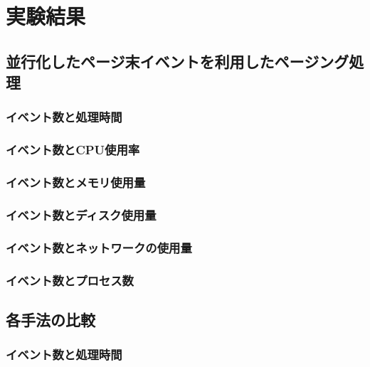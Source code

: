 \documentclass[../../main]{subfiles}
\begin{document}
    \section{実験結果}\label{sec:result}
    
    

    

    

    \subsection{並行化したページ末イベントを利用したページング処理}\label{subsec:result-paging-last-async}
    \subsubsection{イベント数と処理時間}\label{subsubsec:result-paging-last-async-time}
    \subsubsection{イベント数とCPU使用率}\label{subsubsec:result-paging-last-async-cpu}
    \subsubsection{イベント数とメモリ使用量}\label{subsubsec:result-paging-last-async-memory}
    \subsubsection{イベント数とディスク使用量}\label{subsubsec:result-paging-last-async-disk}
    \subsubsection{イベント数とネットワークの使用量}\label{subsubsec:result-paging-last-async-network}
    \subsubsection{イベント数とプロセス数}\label{subsubsec:result-paging-last-async-process}

    \subsection{各手法の比較}\label{subsec:result-cpu}
    \subsubsection{イベント数と処理時間}\label{subsubsec:result-time}
\end{document}
